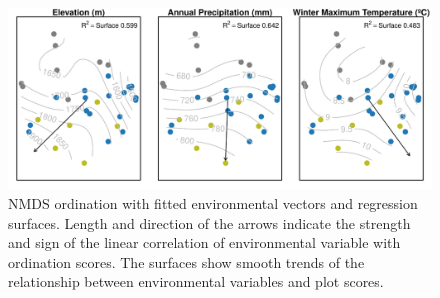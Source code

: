 \begin{figure}
\centering
\includegraphics[width=\textwidth]{img/multivariante/surfaces} 
\caption{NMDS ordination with fitted environmental vectors and regression surfaces. Length and direction of the arrows indicate the strength and sign of the linear correlation of environmental variable with ordination scores. The surfaces show smooth trends of the relationship between environmental variables and plot scores.}
\label{fig:surfaces}
\end{figure}

